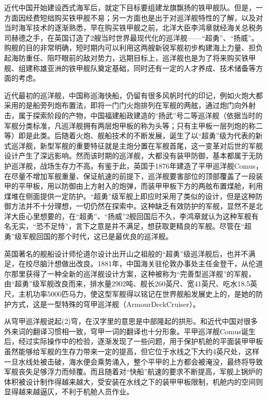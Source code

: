 \documentclass[12pt,UTF8]{ctexbook}
\begin{document}
近代中国开始建设西式海军后，就定下目标要组建龙旗飘扬的铁甲舰队。但是，一方面因经费短绌购买铁甲舰不易；另一方面也是出于对巡洋舰特性的了解，以及对当时海军技术的逐渐熟悉，早在购买铁甲舰之前，北洋大臣李鸿章就经海关总税务司赫德之手，在英国订造了2艘当时世界最现代化的巡洋舰——“超勇”、“扬威”。购舰的目的非常明确，短时期内可以利用这两艘新锐军舰初步构建海上力量、担负起海防重任、阻吓眼前的敌对势力，远期目标上，巡洋舰也是为了将来购买铁甲舰、组建称雄亚洲的铁甲舰队奠定基础，同时还有一定的人才养成、技术储备等方面的考虑。

近代最初的巡洋舰，中国称巡海快船，仍留有很多风帆时代的印记，例如火炮大都采用的是船旁列炮布置法，即将一门门火炮排列在军舰的两舷，通过炮门向外射击，属于探索阶段的产物，中国福建船政建造的“扬武”号二等巡洋舰（依据当时的军舰分类标准，凡巡洋舰拥有两层炮甲板的称为头等；只有主甲板一层列炮的称二等）即是此类。后随着火炮、舰船技术的不断发展，诞生了以“超勇”级为代表的新式巡洋舰，新型军舰的重要特征就是主炮分置在军舰首尾，这一变革对后世的军舰设计产生了深远影响。然而该时期的巡洋舰，大都没有装甲防御，基本都属于无防护巡洋舰，战场生存力不高。有鉴于此，英国于1876年建造了平甲巡洋舰Comus，在尽量不增加军舰重量、保证航速的前提下，巡洋舰要害部位的顶部覆盖了一段装甲的平甲板，用以防御由上方射入的炮弹，而装甲甲板下方的两舷布置煤舱，利用煤堆在侧面提供一定防护。“超勇”级军舰上即应时采用了类似的设计，但是这种防御方法并不十分理想，一切仍然在探索中。这种缺乏有效防护的军舰，显然不是北洋大臣心里想要的，在“超勇”、“扬威”2舰回国后不久，李鸿章就认为这种军舰有名无实，“恐不足恃”，言下之意是并不满足，想获取更精良的军舰。尽管在“超勇”级军舰回国的那个时代，这已是最优良的巡洋舰。

英国著名的舰船设计师伦道尔设计出开山之祖般的“超勇”级巡洋舰后，也并不满足，在绞尽脑汁想做出改良。1881年，中国海关驻伦敦办事处主任金登干，从伦道尔那里获得了一种全新的巡洋舰设计方案，这种被称为“完善型巡洋舰”的军舰，由“超勇”级军舰改良而来，排水量2902吨、舰长260英尺、宽41英尺、吃水18.5英尺，主机功率5000匹马力，使这型军舰得以铭记在世界舰船发展史上的，是她的防护方式，这是一型特殊的穹甲巡洋舰（ArmourDeckCruiser）。

从穹甲巡洋舰说起(2)穹，在汉字里的意思是中部隆起的拱形。和近代中国对很多外来词的翻译习惯相一致，穹甲一词的翻译也十分形象。平甲巡洋舰Comus诞生后，经过实际操作中的检验，逐渐发现了一些问题，用于保护机舱的平面装甲甲板虽然能够给军舰的生存力带来一定的提高，但它位于水线之下大约4英尺处，这样一旦水线处被击破，海水便会乘势涌入，整个平甲的上方都会被淹没，最终将导致军舰丧失足够浮力而倾覆。而且随着对“快船”航速的要求不断提高，军舰上锅炉的体积被设计制作得越来越大，受安装在水线之下的装甲甲板限制，机舱内的空间则显得越来越逼仄，不利于机舱人员作业。
\end{document}
